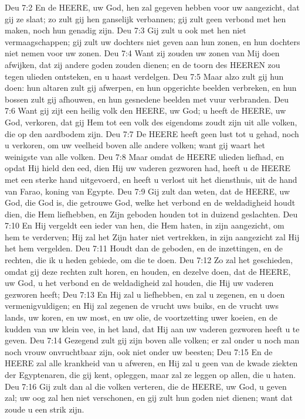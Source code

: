 Deu 7:2  En de HEERE, uw God, hen zal gegeven hebben voor uw aangezicht, dat gij ze slaat; zo zult gij hen ganselijk verbannen; gij zult geen verbond met hen maken, noch hun genadig zijn.
Deu 7:3  Gij zult u ook met hen niet vermaagschappen; gij zult uw dochters niet geven aan hun zonen, en hun dochters niet nemen voor uw zonen.
Deu 7:4  Want zij zouden uw zonen van Mij doen afwijken, dat zij andere goden zouden dienen; en de toorn des HEEREN zou tegen ulieden ontsteken, en u haast verdelgen.
Deu 7:5  Maar alzo zult gij hun doen: hun altaren zult gij afwerpen, en hun opgerichte beelden verbreken, en hun bossen zult gij afhouwen, en hun gesnedene beelden met vuur verbranden.
Deu 7:6  Want gij zijt een heilig volk den HEERE, uw God; u heeft de HEERE, uw God, verkoren, dat gij Hem tot een volk des eigendoms zoudt zijn uit alle volken, die op den aardbodem zijn.
Deu 7:7  De HEERE heeft geen lust tot u gehad, noch u verkoren, om uw veelheid boven alle andere volken; want gij waart het weinigste van alle volken.
Deu 7:8  Maar omdat de HEERE ulieden liefhad, en opdat Hij hield den eed, dien Hij uw vaderen gezworen had, heeft u de HEERE met een sterke hand uitgevoerd, en heeft u verlost uit het diensthuis, uit de hand van Farao, koning van Egypte.
Deu 7:9  Gij zult dan weten, dat de HEERE, uw God, die God is, die getrouwe God, welke het verbond en de weldadigheid houdt dien, die Hem liefhebben, en Zijn geboden houden tot in duizend geslachten.
Deu 7:10  En Hij vergeldt een ieder van hen, die Hem haten, in zijn aangezicht, om hem te verderven; Hij zal het Zijn hater niet vertrekken, in zijn aangezicht zal Hij het hem vergelden.
Deu 7:11  Houdt dan de geboden, en de inzettingen, en de rechten, die ik u heden gebiede, om die te doen.
Deu 7:12  Zo zal het geschieden, omdat gij deze rechten zult horen, en houden, en dezelve doen, dat de HEERE, uw God, u het verbond en de weldadigheid zal houden, die Hij uw vaderen gezworen heeft;
Deu 7:13  En Hij zal u liefhebben, en zal u zegenen, en u doen vermenigvuldigen; en Hij zal zegenen de vrucht uws buiks, en de vrucht uws lands, uw koren, en uw most, en uw olie, de voortzetting uwer koeien, en de kudden van uw klein vee, in het land, dat Hij aan uw vaderen gezworen heeft u te geven.
Deu 7:14  Gezegend zult gij zijn boven alle volken; er zal onder u noch man noch vrouw onvruchtbaar zijn, ook niet onder uw beesten;
Deu 7:15  En de HEERE zal alle krankheid van u afweren, en Hij zal u geen van de kwade ziekten der Egyptenaren, die gij kent, opleggen, maar zal ze leggen op allen, die u haten.
Deu 7:16  Gij zult dan al die volken verteren, die de HEERE, uw God, u geven zal; uw oog zal hen niet verschonen, en gij zult hun goden niet dienen; want dat zoude u een strik zijn.
